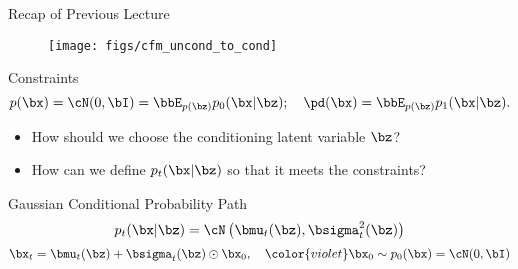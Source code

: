 \documentclass{beamer}
\begin{document}
\begin{frame}
\titlepage
	\resetonslide
\end{frame}
\begin{frame}{Recap of Previous Lecture}
	\begin{figure}
		\centering
		\texttt{[image: figs/cfm\_uncond\_to\_cond]}
	\end{figure}
	\vspace{-0.3cm}
	\begin{block}{Constraints}
		\vspace{-0.3cm}
		\[
			p(\bx) = \cN(0, \bI) = \bbE_{p(\bz)} p_0(\bx | \bz); \quad \pd(\bx) = \bbE_{p(\bz)} p_1(\bx | \bz).
		\]
		\vspace{-0.5cm}
	\end{block}
	\begin{itemize}
		\item How should we choose the conditioning latent variable $\bz$?
		\item How can we define $p_t(\bx | \bz)$ so that it meets the constraints?
	\end{itemize}
	\begin{block}{Gaussian Conditional Probability Path}
		\vspace{-0.3cm}
		\[
			p_t(\bx | \bz) = \cN\left(\bmu_t(\bz), \bsigma_t^2(\bz)\right)
		\]
		\[
			\bx_t = \bmu_t(\bz) + \bsigma_t(\bz) \odot \bx_0, \quad {\color{violet} \bx_0 \sim p_0(\bx) = \cN(0, \bI)}
		\]
	\end{block}
\end{frame}
\end{document}
